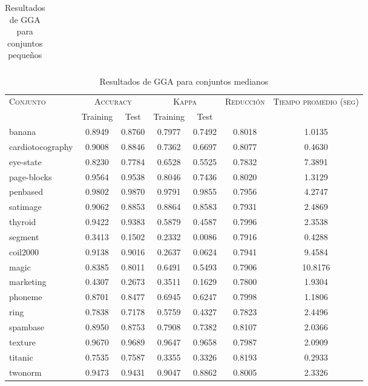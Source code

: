 \begin{table}[]
\begin{tabular}{l c c c c c c}
\hline
\end{tabular}
\caption{Resultados de GGA para conjuntos pequeños }
\label{res-peq-gga}
\end{table}


\begin{table}[]
\centering
\begin{tabular}{l c c c c c c}
\hline
\multirow{2}{*}{\textsc{Conjunto}}
	& \multicolumn{2}{c}{\textsc{Accuracy}}
	& \multicolumn{2}{c}{\textsc{Kappa}}
	& \textsc{Reducción}
	& \textsc{Tiempo promedio (seg)} \\
	& Training & Test
	& Training & Test \\ 
\hline
\hline

banana & 0.8949 & 0.8760 & 0.7977 & 0.7492 & 0.8018 & 1.0135 \\
cardiotocography & 0.9008 & 0.8846 & 0.7362 & 0.6697 & 0.8077 & 0.4630 \\
eye-state & 0.8230 & 0.7784 & 0.6528 & 0.5525 & 0.7832 & 7.3891 \\
page-blocks & 0.9564 & 0.9538 & 0.8046 & 0.7436 & 0.8020 & 1.3129 \\
penbased & 0.9802 & 0.9870 & 0.9791 & 0.9855 & 0.7956 & 4.2747 \\
satimage & 0.9062 & 0.8853 & 0.8864 & 0.8583 & 0.7931 & 2.4869 \\
thyroid & 0.9422 & 0.9383 & 0.5879 & 0.4587 & 0.7996 & 2.3538 \\
segment & 0.3413 & 0.1502 & 0.2332 & 0.0086 & 0.7916 & 0.4288 \\
coil2000 & 0.9138 & 0.9016 & 0.2637 & 0.0624 & 0.7941 & 9.4584 \\
magic & 0.8385 & 0.8011 & 0.6491 & 0.5493 & 0.7906 & 10.8176 \\
marketing & 0.4307 & 0.2673 & 0.3511 & 0.1629 & 0.7800 & 1.9304 \\
phoneme & 0.8701 & 0.8477 & 0.6945 & 0.6247 & 0.7998 & 1.1806 \\
ring & 0.7838 & 0.7178 & 0.5759 & 0.4327 & 0.7823 & 2.4496 \\
spambase & 0.8950 & 0.8753 & 0.7908 & 0.7382 & 0.8107 & 2.0366 \\
texture & 0.9670 & 0.9689 & 0.9647 & 0.9658 & 0.7987 & 2.0909 \\
titanic & 0.7535 & 0.7587 & 0.3355 & 0.3326 & 0.8193 & 0.2933 \\
twonorm & 0.9473 & 0.9431 & 0.9047 & 0.8862 & 0.8005 & 2.3326 \\

\hline
\end{tabular}
\caption{Resultados de GGA para conjuntos medianos }
\label{res-med-gga}
\end{table}



